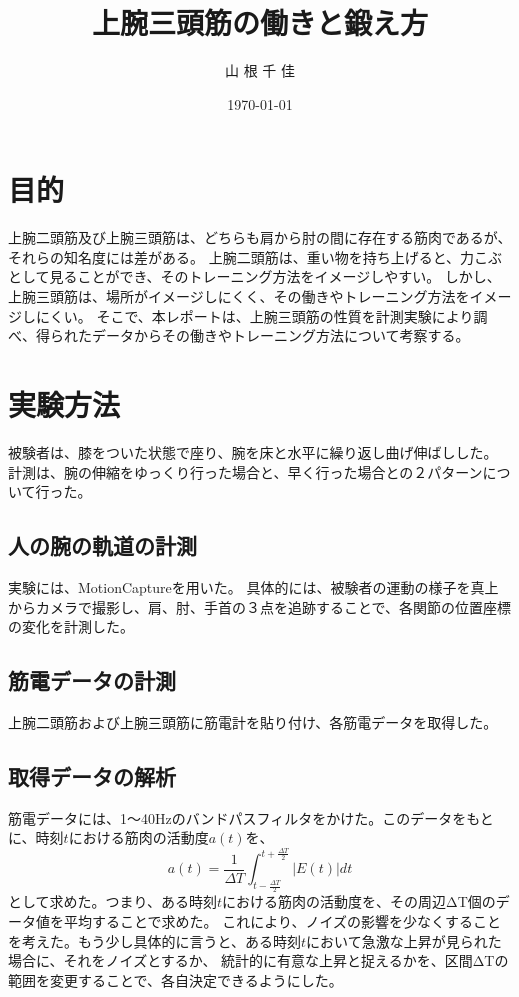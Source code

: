 \documentclass{jsarticle}
\title{上腕三頭筋の働きと鍛え方}
\date{\today}
\author{山 根 千 佳}
\begin{document}
%

\maketitle


\section{目的}
上腕二頭筋及び上腕三頭筋は、どちらも肩から肘の間に存在する筋肉であるが、それらの知名度には差がある。
上腕二頭筋は、重い物を持ち上げると、力こぶとして見ることができ、そのトレーニング方法をイメージしやすい。
しかし、上腕三頭筋は、場所がイメージしにくく、その働きやトレーニング方法をイメージしにくい。
そこで、本レポートは、上腕三頭筋の性質を計測実験により調べ、得られたデータからその働きやトレーニング方法について考察する。

\section{実験方法}
被験者は、膝をついた状態で座り、腕を床と水平に繰り返し曲げ伸ばしした。
計測は、腕の伸縮をゆっくり行った場合と、早く行った場合との２パターンについて行った。

\subsection{人の腕の軌道の計測}
実験には、MotionCaptureを用いた。
具体的には、被験者の運動の様子を真上からカメラで撮影し、肩、肘、手首の３点を追跡することで、各関節の位置座標の変化を計測した。

\subsection{筋電データの計測}
上腕二頭筋および上腕三頭筋に筋電計を貼り付け、各筋電データを取得した。

\subsection{取得データの解析}
筋電データには、1〜40Hzのバンドパスフィルタをかけた。このデータをもとに、時刻$t$における筋肉の活動度$a(t)$を、
$$a(t) = \frac{1}{ΔT} \int_{t-\frac{ΔT}{2}}^{t+\frac{ΔT}{2}} |E(t)|dt $$
として求めた。つまり、ある時刻$t$における筋肉の活動度を、その周辺ΔT個のデータ値を平均することで求めた。
これにより、ノイズの影響を少なくすることを考えた。もう少し具体的に言うと、ある時刻$t$において急激な上昇が見られた場合に、それをノイズとするか、
統計的に有意な上昇と捉えるかを、区間ΔTの範囲を変更することで、各自決定できるようにした。
\end{document}
